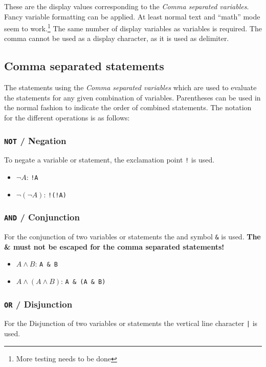 \documentclass[a4paper]{article}
\begin{document}
These are the display values corresponding to the \emph{Comma separated variables}. Fancy variable formatting can be applied. At least normal text and ``math'' mode seem to work.\footnote{More testing needs to be done}
The same number of display variables as variables is required. The comma cannot be used as a display character, as it is used as delimiter.

\subsection{Comma separated statements}

The statements using the \emph{Comma separated variables} which are used to evaluate the statements for any given combination of variables. Parentheses can be used in the normal fashion to indicate the order of combined statements. The notation for the different operations is as follows:

\subsubsection{\texttt{NOT} / Negation}

To negate a variable or statement, the exclamation point \texttt{!} is used.
\begin{itemize}
    \item $\lnot A$:  \texttt{!A}
    \item $\lnot (\lnot A)$: \texttt{!(!A)}
\end{itemize}

\subsubsection{\texttt{AND} / Conjunction}

For the conjunction of two variables or statements the and symbol \texttt{\&} is used. \textbf{The \& must not be escaped for the comma separated statements!}
\begin{itemize}
    \item $A \land B$:  \texttt{A \& B}
    \item $A \land (A \land B)$: \texttt{A \& (A \& B)}
\end{itemize}

\subsubsection{\texttt{OR} / Disjunction}

For the Disjunction of two variables or statements the vertical line character \texttt{|} is used.
\end{document}

